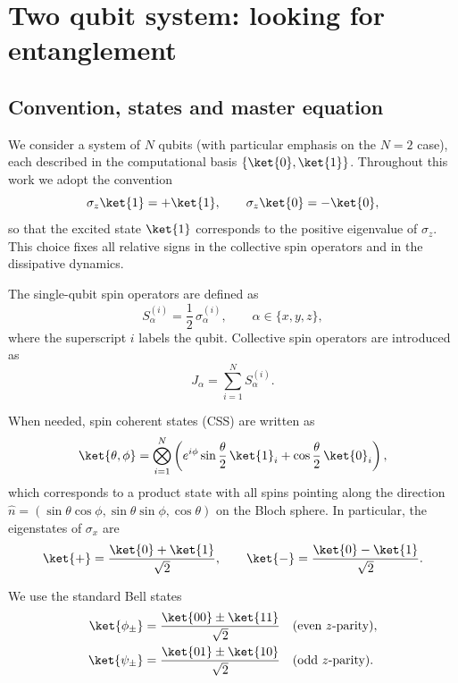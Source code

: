 \chapter{Two qubit system: looking for entanglement}

\section{Convention, states and master equation}

We consider a system of $N$ qubits (with particular emphasis on the $N=2$ case), each described in the computational basis
$\{\ket{0},\ket{1}\}$.
Throughout this work we adopt the convention
\begin{equation}
	\sigma_z \ket{1} = + \ket{1}, 
	\qquad
	\sigma_z \ket{0} = - \ket{0},
\end{equation}
so that the excited state $\ket{1}$ corresponds to the positive eigenvalue of $\sigma_z$.
This choice fixes all relative signs in the collective spin operators and in the dissipative dynamics.

The single-qubit spin operators are defined as
\begin{equation}
	S_\alpha^{(i)} = \frac{1}{2}\,\sigma_\alpha^{(i)},
	\qquad \alpha \in \{x,y,z\},
\end{equation}
where the superscript $i$ labels the qubit.
Collective spin operators are introduced as
\begin{equation}
	J_\alpha = \sum_{i=1}^{N} S_\alpha^{(i)}.
\end{equation}

When needed, spin coherent states (CSS) are written as
\begin{equation}
	\ket{\theta,\phi}
	=
	\bigotimes_{i=1}^{N}
	\left(
	e^{i\phi}\sin\frac{\theta}{2}\,\ket{1}_i
	+
	\cos\frac{\theta}{2}\,\ket{0}_i
	\right),
\end{equation}
which corresponds to a product state with all spins pointing along the direction
$\hat{n} = (\sin\theta\cos\phi,\sin\theta\sin\phi,\cos\theta)$ on the Bloch sphere.
In particular, the eigenstates of $\sigma_x$ are
\begin{equation}
	\ket{+}=\frac{\ket{0}+\ket{1}}{\sqrt{2}},
	\qquad
	\ket{-}=\frac{\ket{0}-\ket{1}}{\sqrt{2}}.
\end{equation}

	We use the standard Bell states
\begin{align}
	\ket{\phi_\pm}&=\frac{\ket{00}\pm\ket{11}}{\sqrt{2}}
	\quad(\text{even $z$-parity}),\\
	\ket{\psi_\pm}&=\frac{\ket{01}\pm\ket{10}}{\sqrt{2}}
	\quad(\text{odd $z$-parity}).
\end{align}

